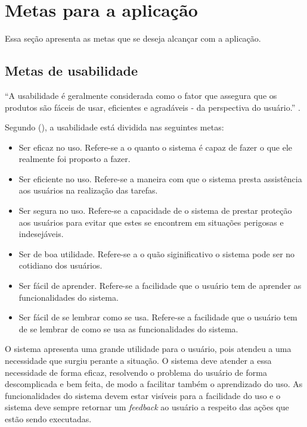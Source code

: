 \chapter{Metas para a aplicação}
  
  Essa seção apresenta as metas que se deseja alcançar com a aplicação.

  \section{Metas de usabilidade}
  
    “A usabilidade é geralmente considerada como o fator que assegura que os produtos são fáceis de usar, 
    eficientes e agradáveis - da perspectiva do usuário.” \cite{preece}.
    
    Segundo \citeauthor{preece} (\citeyear{preece}), a usabilidade está dividida nas seguintes metas:
    
    \begin{itemize}
       \item Ser eficaz no uso.
       \subitem Refere-se a o quanto o sistema é capaz de fazer o que ele realmente foi proposto a fazer.
 
       \item Ser eficiente no uso.
       \subitem Refere-se a maneira com que o sistema presta assistência aos usuários na realização das tarefas.

       \item Ser segura no uso.
       \subitem Refere-se a capacidade de o sistema de prestar proteção aos usuários para evitar que estes se encontrem 
       em situações perigosas e indesejáveis.

       \item Ser de boa utilidade.
       \subitem Refere-se a o quão siginificativo o sistema pode ser no cotidiano dos usuários.

       \item Ser fácil de aprender.
       \subitem Refere-se a facilidade que o usuário tem de aprender as funcionalidades do sistema.

       \item Ser fácil de se lembrar como se usa.
       \subitem Refere-se a facilidade que o usuário tem de se lembrar de como se usa as funcionalidades do sistema.
    \end{itemize}
  
    O sistema apresenta uma grande utilidade para o usuário, pois atendeu a uma necessidade que surgiu perante a situação. 
    O sistema deve atender a essa necessidade de forma eficaz, resolvendo o problema do usuário de forma
    descomplicada e bem feita, de modo a facilitar também o aprendizado do uso. As funcionalidades do sistema devem estar visíveis 
    para a facilidade do uso e o sistema deve sempre retornar um \textit{feedback} ao usuário a respeito das ações que estão
    sendo executadas.
    
